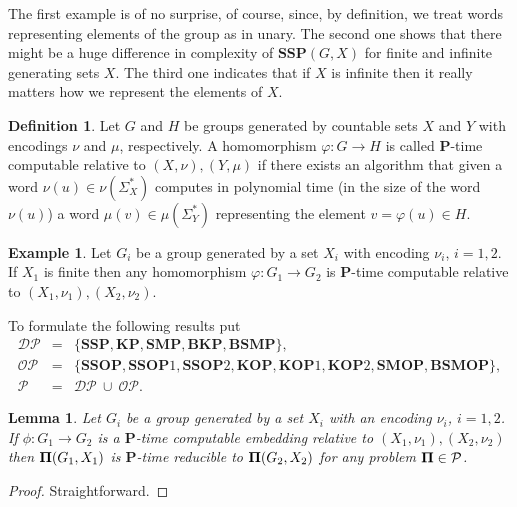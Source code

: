 \documentclass[10pt]{amsart}
\newtheorem{lemma}[theorem]{Lemma}
\theoremstyle{definition}
\newtheorem{example}[theorem]{Example}
\newtheorem{definition}[theorem]{Definition}
\def\P{{\mathbf{P}}}
\def\SSP{{\mathbf{SSP}}}
\def\SMP{{\mathbf{SMP}}}
\def\BSMP{{\mathbf{BSMP}}}
\def\BKP{{\mathbf{BKP}}}
\def\KP{{\mathbf{KP}}}
\def\KOP{{\mathbf{KOP}}}
\def\SSOP{{\mathbf{SSOP}}}
\def\SMOP{{\mathbf{SMOP}}}
\def\BSMOP{{\mathbf{BSMOP}}}
\begin{document}
The first  example is of no surprise, of course, since, by definition,  we  treat words representing elements of the group  as in unary.
The second one shows that there might be a huge difference in complexity of $\SSP(G,X)$ for finite and infinite generating sets $X$. The third one indicates that if $X$ is infinite then it really matters how we represent the elements of $X$.




\begin{definition}
Let $G$ and $H$ be groups generated by countable sets $X$ and $Y$ with encodings $\nu$ and $\mu$, respectively. A homomorphism $\varphi:G \to H$
is called $\P$-time computable relative to $(X,\nu), (Y,\mu)$
if there exists an algorithm that
given a word $\nu(u) \in \nu(\Sigma_X^*)$
computes in polynomial time  (in the size of the word $\nu(u)$)  a word $\mu(v) \in \mu(\Sigma_Y^{\ast})$
representing  the element $v=\varphi(u)\in H$.
\end{definition}

\begin{example} \label{ex:finite}
Let $G_i$ be a group generated by a set $X_i$ with encoding $\nu_i$, $i = 1,2$. If $X_1$ is finite then any homomorphism $\varphi:G_1 \to G_2$ is
$\P$-time computable relative to $(X_1,\nu_1), (X_2,\nu_2)$.
\end{example}
To formulate the  following results put
\begin{eqnarray*}
{\mathcal{DP}} &=& \{\SSP,\KP,\SMP,\BKP,\BSMP\},\\
{\mathcal{OP}} &=& \{\SSOP,\SSOP1,\SSOP2, \KOP,\KOP1, \KOP2,\SMOP,\BSMOP\},\\
{\mathcal P}&=&{\mathcal{DP}}\ \cup\ {\mathcal{OP}}.
\end{eqnarray*}



\begin{lemma}\label{le:SSP_reduction}
Let $G_i$ be a group generated by a set $X_i$ with an encoding $\nu_i$, $i = 1,2$. If $\phi:G_1 \to G_2$ is a $\P$-time computable embedding
relative to $(X_1,\nu_1), (X_2,\nu_2)$ then   ${\bf \Pi}(G_1,X_1)$ is $\P$-time  reducible to ${\bf \Pi}(G_2,X_2)$ for any problem ${\bf \Pi} \in \mathcal{P}$.

\end{lemma}

\begin{proof}
Straightforward.
\end{proof}
\end{document}
